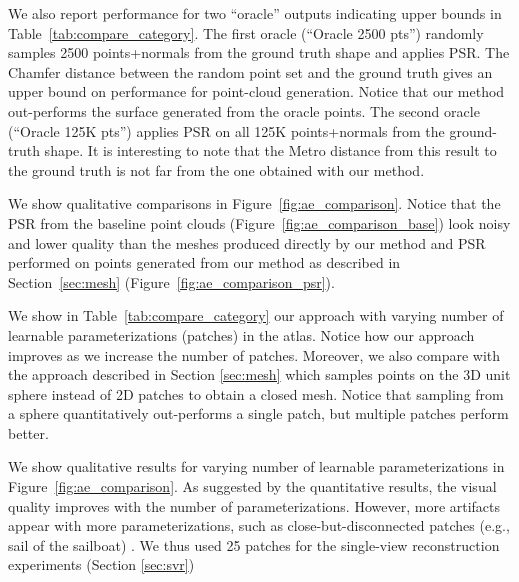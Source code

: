 \documentclass[10pt,twocolumn,letterpaper]{article}
\newcommand{\myparagraph}[1]{\vspace{3pt}\noindent{\bf #1}}
\begin{document}
We also report performance for two ``oracle'' outputs indicating upper bounds in Table~\ref{tab:compare_category}. 
The first oracle (``Oracle 2500 pts'') randomly samples 2500 points+normals from the ground truth shape and applies PSR. 
The Chamfer distance between the random point set and the ground truth gives an upper bound on performance for point-cloud generation. 
Notice that our method out-performs the surface generated from the oracle points. 
The second oracle (``Oracle 125K pts'') applies PSR on all 125K points+normals from the ground-truth shape. 
It is interesting to note that the Metro distance from this result to the ground truth is not far from the one obtained with our method.

We show qualitative comparisons in Figure~\ref{fig:ae_comparison}.
Notice that the PSR from the baseline point clouds (Figure~\ref{fig:ae_comparison_base}) look noisy and lower quality than the meshes produced directly by our method and PSR performed on points generated from our method as described in Section~\ref{sec:mesh} (Figure~\ref{fig:ae_comparison_psr}). 

\myparagraph{Sensitivity to number of patches.}
We show in Table~\ref{tab:compare_category} our approach with varying number of learnable parameterizations (patches) in the atlas.
Notice how our approach improves as we increase the number of patches.
Moreover, we also compare with the approach described in Section \ref{sec:mesh} which samples points on the 3D unit sphere instead of 2D patches to obtain a closed mesh. Notice that sampling from a sphere quantitatively out-performs a single patch, but multiple patches perform better.


We show qualitative results for varying number of learnable parameterizations in Figure~\ref{fig:ae_comparison}. As suggested by the quantitative results, the visual quality improves with the number of parameterizations. 
However, more artifacts appear with more parameterizations, such as close-but-disconnected patches (e.g., sail of the sailboat) . We thus used 25 patches for the single-view reconstruction experiments (Section \ref{sec:svr})
\end{document}
